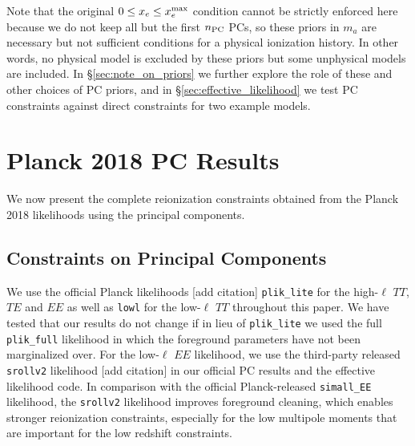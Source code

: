 \documentclass[prd,twocolumn,amsmath,amssymb,floatfix,superscriptaddress,nofootinbib]{revtex4-1}
\begin{document}
%
Note that the original $0\le x_e \le x_e^{\rm max}$ condition cannot be strictly enforced here because we do not keep all but the first $n_{\rm PC}$ PCs, so these priors in $m_a$ are necessary but not sufficient conditions for a physical ionization history.  
In other words, no physical model is excluded by these priors but some unphysical models are included.  In \S \ref{sec:note_on_priors} we further explore the role of these and other choices of PC priors, and in \S\ref{sec:effective_likelihood} we test PC constraints against direct constraints for two example models.  



\section{Planck 2018 PC Results}
\label{sec:results}
We now present the complete reionization constraints obtained from the Planck 2018 likelihoods using the principal components.
\subsection{Constraints on Principal Components}
We use the official Planck likelihoods [add citation] \texttt{plik\_lite} for the high-$\ell$ $TT$, $TE$ and $EE$ as well as \texttt{lowl} for the low-$\ell$ $TT$ throughout this paper. We have tested that our results do not change if in lieu of \texttt{plik\_lite} we used the full \texttt{plik\_full} likelihood in which the foreground parameters have not been marginalized over. For the low-$\ell$ $EE$ likelihood, we use the third-party released \texttt{srollv2} likelihood [add citation] in our official PC results and the effective likelihood code. In comparison with the official Planck-released \texttt{simall\_EE} likelihood, the \texttt{srollv2} likelihood improves foreground cleaning, 
which enables stronger reionization constraints, especially for the low multipole moments that are important for the low redshift constraints.

\end{document}
